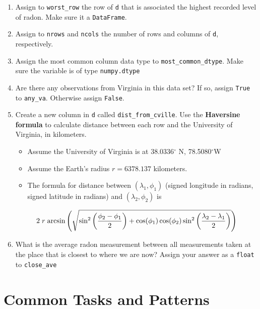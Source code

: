 \documentclass[12pt,krantz2]{krantz}
\providecommand{\tightlist}{%
  \setlength{\itemsep}{0pt}\setlength{\parskip}{0pt}}
\begin{document}
\begin{enumerate}
\def\labelenumi{\alph{enumi})}
\tightlist
\item
  Assign to \texttt{worst\_row} the row of \texttt{d} that is associated the highest recorded level of radon. Make sure it a \texttt{DataFrame}.
\item
  Assign to \texttt{nrows} and \texttt{ncols} the number of rows and columns of \texttt{d}, respectively.
\item
  Assign the most common column data type to \texttt{most\_common\_dtype}. Make sure the variable is of type \texttt{numpy.dtype}
\item
  Are there any observations from Virginia in this data set? If so, assign \texttt{True} to \texttt{any\_va}. Otherwise assign \texttt{False}.
\item
  Create a new column in \texttt{d} called \texttt{dist\_from\_cville}. Use the \textbf{Haversine formula} to calculate distance between each row and the University of Virginia, in kilometers.

  \begin{itemize}
  \tightlist
  \item
    Assume the University of Virginia is at 38.0336\(^\circ\) N, 78.5080\(^\circ\)W
  \item
    Assume the Earth's radius \(r = 6378.137\) kilometers.
  \item
    The formula for distance between \((\lambda_1, \phi_1)\) (signed longitude in radians, signed latitude in radians) and \((\lambda_2, \phi_2)\) is
  \end{itemize}

  \begin{equation}
   2 \hspace{1mm} r \hspace{1mm} \text{arcsin}\left( \sqrt{ \sin^2\left( \frac{\phi_2 - \phi_1}{2}\right)  + \cos(\phi_1)\cos(\phi_2) \sin^2\left( \frac{\lambda_2 - \lambda_1}{2} \right)  } \right)
   \end{equation}
\item
  What is the average radon measurement between all measurements taken at the place that is closest to where we are now? Assign your answer as a \texttt{float} to \texttt{close\_ave}
\end{enumerate}

\hypertarget{part-common-tasks-and-patterns}{%
\part{Common Tasks and Patterns}\label{part-common-tasks-and-patterns}}
\end{document}
